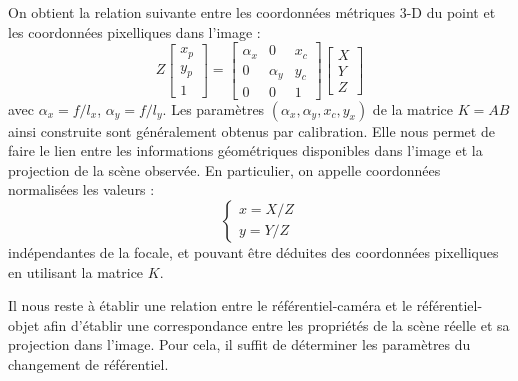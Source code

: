 On obtient la relation suivante entre les coordonnées métriques 3-D du point et les coordonnées pixelliques dans l'image :
\begin{equation}
Z\begin{bmatrix}
x_p \\y_p \\ 1
\end{bmatrix}
=
\begin{bmatrix}
\alpha_x & 0 & x_c \\ 0 & \alpha_y & y_c \\ 0 & 0 & 1 
\end{bmatrix}
\begin{bmatrix}
X \\ Y \\ Z
\end{bmatrix}
\label{intro:eq16}
\end{equation}
avec $\alpha_x = f/l_x$, $\alpha_y = f/l_y$. Les paramètres $(\alpha_x, \alpha_y, x_c, y_x)$ de la matrice $K = AB$ ainsi construite sont généralement obtenus par calibration. Elle nous permet de faire le lien entre les informations géométriques disponibles dans l'image et la projection de la scène observée. En particulier, on appelle coordonnées normalisées les valeurs :
\begin{equation}
\left \lbrace
\begin{matrix}
x = X/Z \\
y = Y/Z
\end{matrix} \right .
\label{intro:eq17}
\end{equation}
indépendantes de la focale, et pouvant être déduites des coordonnées pixelliques en utilisant la matrice $K$.

Il nous reste à établir une relation entre le référentiel-caméra et le référentiel-objet afin d'établir une correspondance entre les propriétés de la scène réelle et sa projection dans l'image. Pour cela, il suffit de déterminer les paramètres du changement de référentiel.

